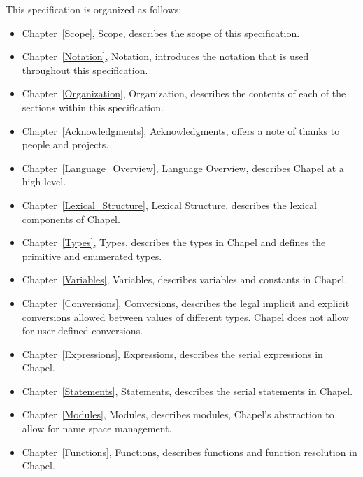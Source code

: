 \label{Organization}

This specification is organized as follows:
\begin{itemize}

\item
Chapter~\ref{Scope}, Scope, describes the scope of this specification.

\item
Chapter~\ref{Notation}, Notation, introduces the notation that is used
throughout this specification.

\item
Chapter~\ref{Organization}, Organization, describes the contents of
each of the sections within this specification.

\item
Chapter~\ref{Acknowledgments}, Acknowledgments, offers a note of
thanks to people and projects.

\item
Chapter~\ref{Language_Overview}, Language Overview, describes Chapel
at a high level.

\item
Chapter~\ref{Lexical_Structure}, Lexical Structure, describes the
lexical components of Chapel.

\item
Chapter~\ref{Types}, Types, describes the types in Chapel and defines
the primitive and enumerated types.

\item
Chapter~\ref{Variables}, Variables, describes variables and constants
in Chapel.

\item
Chapter~\ref{Conversions}, Conversions, describes the legal implicit
and explicit conversions allowed between values of different types.
Chapel does not allow for user-defined conversions.

\item
Chapter~\ref{Expressions}, Expressions, describes the serial
expressions in Chapel.

\item
Chapter~\ref{Statements}, Statements, describes the serial statements
in Chapel.

\item
Chapter~\ref{Modules}, Modules, describes modules, Chapel's
abstraction to allow for name space management.

\item
Chapter~\ref{Functions}, Functions, describes functions and function
resolution in Chapel.


\end{itemize}
